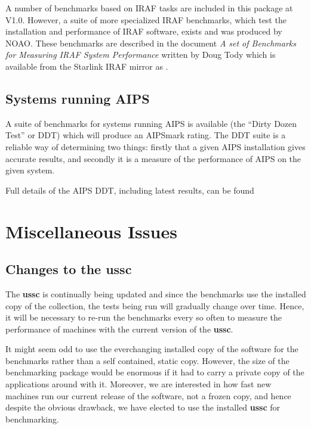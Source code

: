 A number of benchmarks based on IRAF tasks are included in this package
at V1.0. However, a suite of more specialized IRAF benchmarks, which
test the installation and performance of IRAF software, exists and was
produced by NOAO. These benchmarks are described in the document {\em A
set of Benchmarks for Measuring IRAF System Performance} written by
Doug Tody which is available from the Starlink IRAF mirror as
.


\subsection{Systems running AIPS}

A suite of benchmarks for systems running AIPS is available (the
``Dirty Dozen Test'' or DDT) which will produce an AIPSmark rating.
The DDT suite is a reliable way of determining two things:  firstly
that a given AIPS installation gives accurate results, and secondly it
is a measure of the performance of AIPS on the given system.

Full details of the AIPS DDT, including latest results, can be found

\section{Miscellaneous Issues}

\subsection{Changes to the ussc}
\label{ussc-changes}

The {\bf ussc} is continually being updated and since the benchmarks use the 
installed copy of the collection, the tests being run will gradually
change over time. Hence, it will be necessary to re-run the benchmarks
every so often to measure the performance of machines with the current
version of the {\bf ussc}. 


It might seem odd to use the everchanging installed copy of the 
software for the benchmarks rather than a self contained, static copy.
However, the size of the benchmarking package would be enormous if
it had to carry a private copy of the applications around with it.
Moreover, we are interested in how fast new machines run our current
release of the software, not a frozen copy, and hence despite the
obvious drawback, we have elected to use the installed {\bf ussc} for
benchmarking.

